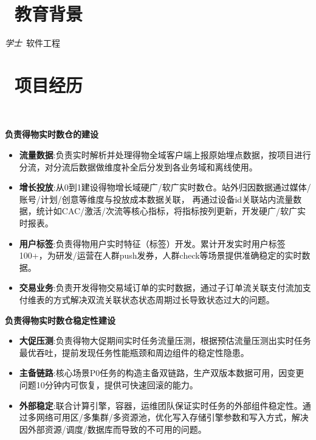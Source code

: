 \documentclass{resume}
\begin{document}



\section{\faGraduationCap\  教育背景}
\textit{学士}\ 软件工程


\section{\faUsers\ 项目经历}
\role{实时计算专家}\

\textbf{负责得物实时数仓的建设}
\begin{itemize}
  \item \textbf{流量数据}:负责实时解析并处理得物全域客户端上报原始埋点数据，按项目进行分流，对分流后数据做维度补全后分发到各业务域和离线使用。
  \item \textbf{增长投放}:从0到1建设得物增长域硬广/软广实时数仓。站外归因数据通过媒体/账号/计划/创意等维度与投放成本数据关联， 再通过设备id关联站内流量数据，统计如CAC/激活/次流等核心指标，将指标按列更新，开发硬广/软广实时报表。
  \item \textbf{用户标签}:负责得物用户实时特征（标签）开发。累计开发实时用户标签100+，为研发/运营在人群push发券，人群check等场景提供准确稳定的实时数据。
  \item \textbf{交易业务}:负责开发得物交易域订单的实时数据，通过子订单流关联支付流加支付维表的方式解决双流关联状态状态周期过长导致状态过大的问题。
\end{itemize}

\textbf{负责得物实时数仓稳定性建设}
\begin{itemize}
  \item \textbf{大促压测}:负责得物大促期间实时任务流量压测，根据预估流量压测出实时任务最优吞吐，提前发现任务性能瓶颈和周边组件的稳定性隐患。
  \item \textbf{主备链路}:核心场景P0任务的构造主备双链路，生产双版本数据可用，因变更问题10分钟内可恢复，提供可快速回滚的能力。
  \item \textbf{外部稳定}:联合计算引擎，容器，运维团队保证实时任务的外部组件稳定性。通过多网络可用区/多集群/多资源池，优化写入存储引擎参数和写入方式，解决因外部资源/调度/数据库而导致的不可用的问题。
\end{itemize}
\end{document}
